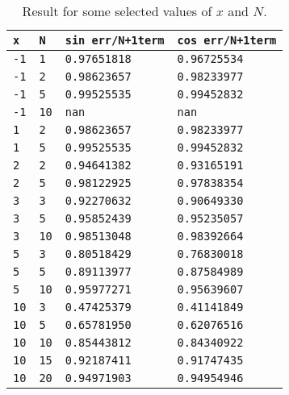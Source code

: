\documentclass[a4paper,10pt]{article}
\begin{document}
\begin{table}[!ht]
\centering 
  \begin{minipage}[t]{105mm}
    \caption{
      Result for some selected values of $x$ and $N$.
    } 
    \label{TABtask12}
  \end{minipage}

  \vspace{5mm}
  \begin{tabular}{l l l l} 
    \texttt{x}&\texttt{N}&\texttt{sin err/N+1term} & \texttt{cos err/N+1term} \\
    \hline
    \texttt{-1}	& \texttt{1}	& \texttt{0.97651818} & \texttt{0.96725534} 	\\
    \texttt{-1}	& \texttt{2}	& \texttt{0.98623657} & \texttt{0.98233977} 	\\
    \texttt{-1}	& \texttt{5}	& \texttt{0.99525535} & \texttt{0.99452832} 	\\
    \texttt{-1}	& \texttt{10}	& \texttt{nan} & \texttt{nan} 	\\
    \hline 
    \texttt{1}	& \texttt{2}	& \texttt{0.98623657} & \texttt{0.98233977} 	\\
    \texttt{1}	& \texttt{5}	& \texttt{0.99525535} & \texttt{0.99452832} 	\\
    \hline
    \texttt{2}	& \texttt{2} 	& \texttt{0.94641382} & \texttt{0.93165191}	\\
    \texttt{2}	& \texttt{5}	& \texttt{0.98122925} & \texttt{0.97838354}	\\
    \hline
    \texttt{3}	& \texttt{3}	& \texttt{0.92270632} & \texttt{0.90649330}	\\
    \texttt{3}	& \texttt{5}	& \texttt{0.95852439} & \texttt{0.95235057}	\\
    \texttt{3}	& \texttt{10}	& \texttt{0.98513048} & \texttt{0.98392664}	\\
    \hline
    \texttt{5}	& \texttt{3}	& \texttt{0.80518429} & \texttt{0.76830018}	\\
    \texttt{5}	& \texttt{5}	& \texttt{0.89113977} & \texttt{0.87584989}	\\
    \texttt{5}	& \texttt{10}	& \texttt{0.95977271} & \texttt{0.95639607}	\\
    \hline
    \texttt{10}	& \texttt{3}	& \texttt{0.47425379} & \texttt{0.41141849}	\\
    \texttt{10}	& \texttt{5}	& \texttt{0.65781950} & \texttt{0.62076516}	\\
    \texttt{10}	& \texttt{10}	& \texttt{0.85443812} & \texttt{0.84340922}	\\
    \texttt{10}	& \texttt{15}	& \texttt{0.92187411} & \texttt{0.91747435}	\\
    \texttt{10}	& \texttt{20}	& \texttt{0.94971903} & \texttt{0.94954946}	\\
  \end{tabular}
\end{table}
\end{document}
